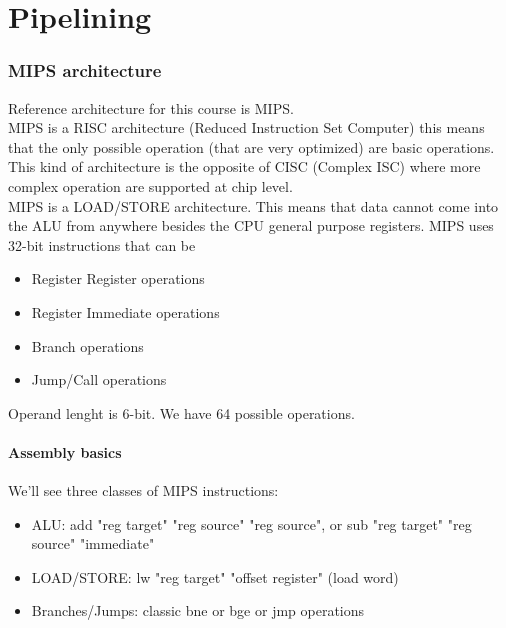 \documentclass[10pt,a4paper]{article}
\begin{document}
	\part{Pipelining}
		\section{MIPS architecture}
			Reference architecture for this course is MIPS.\\
			MIPS is a RISC architecture (Reduced Instruction Set Computer) this means that the only possible operation (that are very optimized) are basic operations. This kind of architecture is the opposite of CISC (Complex ISC) where more complex operation are supported at chip level.\\
			MIPS is a LOAD/STORE architecture. This means that data cannot come into the ALU from anywhere besides the CPU general purpose registers. MIPS uses 32-bit instructions that can be
			\begin{itemize}
				\item Register Register operations
				\item Register Immediate operations
				\item Branch operations
				\item Jump/Call operations
			\end{itemize}
			Operand lenght is 6-bit. We have 64 possible operations.\\
			
			\subsection{Assembly basics}
				We'll see three classes of MIPS instructions:
				\begin{itemize}
					\item ALU: add "reg target" "reg source" "reg source", or sub "reg target" "reg source" "immediate"
					\item LOAD/STORE: lw "reg target" "offset register" (load word)
					\item Branches/Jumps: classic bne or bge or jmp operations
				\end{itemize}
			
\end{document}
